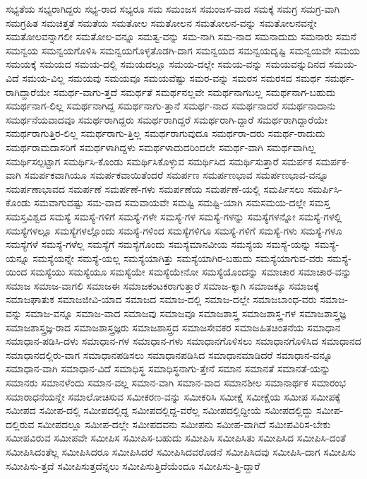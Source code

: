 {ಸಭ್ಯತೆಯ
ಸಭ್ಯರಾಗಿದ್ದರು
ಸಭ್ಯ-ರಾದ
ಸಭ್ಯರೂ
ಸಮ
ಸಮಂಜಸ
ಸಮಂಜಸ-ವಾದ
ಸಮಕ್ಕೆ
ಸಮಗ್ರ
ಸಮಗ್ರ-ವಾಗಿ
ಸಮಗ್ರಹಿತ
ಸಮಚಿತ್ತತೆ
ಸಮತೆಯ
ಸಮತೋಲ
ಸಮತೋಲನ
ಸಮತೋಲನ-ವನ್ನು
ಸಮತೋಲನವನ್ನೇ
ಸಮತೋಲವನ್ನಾಗಲೀ
ಸಮತೋಲ-ವನ್ನೂ
ಸಮತ್ವ-ವನ್ನು
ಸಮ-ನಾಗಿ
ಸಮ-ನಾದ
ಸಮನಾದುದು
ಸಮನಾರು
ಸಮನೆ
ಸಮನ್ವಯ
ಸಮನ್ವಯಗೊಳಿಸಿ
ಸಮನ್ವಯಗೊಳ್ಳತೊಡಗಿ-ದಾಗ
ಸಮನ್ವಯದ
ಸಮನ್ವಯದೃಷ್ಟಿ
ಸಮನ್ವಯವೇ
ಸಮಯ
ಸಮಯಕ್ಕೆ
ಸಮಯದ
ಸಮಯ-ದಲ್ಲಿ
ಸಮಯದಲ್ಲೂ
ಸಮಯ-ದಲ್ಲೇ
ಸಮಯ-ವನ್ನು
ಸಮಯವನ್ನುದಿನದ
ಸಮಯ-ವಿದೆ
ಸಮಯ-ವಿಲ್ಲ
ಸಮಯವು
ಸಮಯವೂ
ಸಮಯವೆಷ್ಟು
ಸಮರ-ವನ್ನು
ಸಮರಸ
ಸಮರಸದ
ಸಮರ್ಥ
ಸಮರ್ಥ-ರಾಗಿದ್ದಾರೆಯೇ
ಸಮರ್ಥ-ವಾಗು-ತ್ತದೆ
ಸಮರ್ಥತೆ
ಸಮರ್ಥನಲ್ಲವೇ
ಸಮರ್ಥನಾಗಬಲ್ಲ
ಸಮರ್ಥನಾಗ-ಬಹುದು
ಸಮರ್ಥನಾಗ-ಲಿಲ್ಲ
ಸಮರ್ಥನಾಗಿದ್ದ
ಸಮರ್ಥನಾಗು-ತ್ತಾನೆ
ಸಮರ್ಥ-ನಾದ
ಸಮರ್ಥನಾದರೆ
ಸಮರ್ಥನಾದಾನು
ಸಮರ್ಥನೆಯವಾದವೂ
ಸಮರ್ಥರಾಗಿದ್ದರು
ಸಮರ್ಥರಾಗಿದ್ದರೆ
ಸಮರ್ಥರಾಗಿ-ದ್ದಾರೆ
ಸಮರ್ಥರಾಗಿದ್ದಾರೆಯೇ
ಸಮರ್ಥರಾಗುತ್ತಿರ-ಲಿಲ್ಲ
ಸಮರ್ಥರಾಗು-ತ್ತಿಲ್ಲ
ಸಮರ್ಥರಾಗುವುದೂ
ಸಮರ್ಥರಾ-ದರು
ಸಮರ್ಥ-ರಾದುದು
ಸಮರ್ಥರಾಮದಾಸರಿಗೆ
ಸಮರ್ಥಳಾಗಿದ್ದಳು
ಸಮರ್ಥಳಾದುದರಿಂದಲೇ
ಸಮರ್ಥ-ವಾಗಿ
ಸಮರ್ಥವಾಗಿಲ್ಲ
ಸಮರ್ಥಿಸಲ್ಪಟ್ಟಾಗ
ಸಮರ್ಥಿಸಿ-ಕೊಂಡು
ಸಮರ್ಥಿಸಿಕೊಳ್ಳುವ
ಸಮರ್ಥಿಸಿದ
ಸಮರ್ಥಿಸುತ್ತಾರೆ
ಸಮರ್ಪಕ
ಸಮರ್ಪಕ-ವಾಗಿ
ಸಮರ್ಪಕವಾಗಿಯೂ
ಸಮರ್ಪಕವಾಯಿತೆಂದರೆ
ಸಮರ್ಪಣ
ಸಮರ್ಪಣಭಾವ
ಸಮರ್ಪಣಭಾವ-ವನ್ನೂ
ಸಮರ್ಪಣಾಭಾವದ
ಸಮರ್ಪಣೆ
ಸಮರ್ಪಣೆ-ಗಳು
ಸಮರ್ಪಣೆಯ
ಸಮರ್ಪಣೆ-ಯಲ್ಲಿ
ಸಮರ್ಪಿಸಲು
ಸಮರ್ಪಿಸಿ-ಕೊಂಡು
ಸಮವಾಗುವಷ್ಟು
ಸಮ-ವಾದ
ಸಮವಾಯವೇ
ಸಮಷ್ಟಿ
ಸಮಷ್ಟಿ-ಯಾಗಿ
ಸಮಸಮಯ-ದಲ್ಲೇ
ಸಮಸ್ತ
ಸಮಸ್ತವಿಶ್ವದ
ಸಮಸ್ಯೆ
ಸಮಸ್ಯೆ-ಗಳಿಗೆ
ಸಮಸ್ಯೆ-ಗಳೇ
ಸಮಸ್ಯೆ-ಗಳ
ಸಮಸ್ಯೆ-ಗಳನ್ನು
ಸಮಸ್ಯೆಗಳನ್ನೋ
ಸಮಸ್ಯೆ-ಗಳಲ್ಲಿ
ಸಮಸ್ಯೆಗಳಲ್ಲೂ
ಸಮಸ್ಯೆಗಳಲ್ಲೊಂದು
ಸಮಸ್ಯೆ-ಗಳಿಂದ
ಸಮಸ್ಯೆಗಳಿಗೂ
ಸಮಸ್ಯೆ-ಗಳಿಗೆ
ಸಮಸ್ಯೆ-ಗಳು
ಸಮಸ್ಯೆ-ಗಳೂ
ಸಮಸ್ಯೆಗಳೆ
ಸಮಸ್ಯೆ-ಗಳೆಲ್ಲ
ಸಮಸ್ಯೆಗೆ
ಸಮಸ್ಯೆಗೊಂದು
ಸಮಸ್ಯೆಮಾನವೀಯ
ಸಮಸ್ಯೆಯ
ಸಮಸ್ಯೆ-ಯನ್ನು
ಸಮಸ್ಯೆ-ಯನ್ನೂ
ಸಮಸ್ಯೆಯನ್ನೇ
ಸಮಸ್ಯೆ-ಯಲ್ಲ
ಸಮಸ್ಯೆಯಾಗಿತ್ತು
ಸಮಸ್ಯೆಯಾಗಿರ-ಬಹುದು
ಸಮಸ್ಯೆಯಾಗುವ-ವರು
ಸಮಸ್ಯೆ-ಯಿಂದ
ಸಮಸ್ಯೆಯು
ಸಮಸ್ಯೆಯೂ
ಸಮಸ್ಯೆಯೇ
ಸಮಸ್ಯೆಯೇನೋ
ಸಮಸ್ಯೆಯೊಂದನ್ನು
ಸಮಾಚಾರ
ಸಮಾಚಾರ-ವನ್ನು
ಸಮಾಜ
ಸಮಾಜ-ವಾಗಲಿ
ಸಮಾಜಈ
ಸಮಾಜಕಂಟಕರಾಗುತ್ತಾರೆ
ಸಮಾಜ-ಕ್ಕಾಗಿ
ಸಮಾಜಕ್ಕೂ
ಸಮಾಜಕ್ಕೆ
ಸಮಾಜಘಾತುಕ
ಸಮಾಜಜೀವಿ-ಯಾದ
ಸಮಾಜದ
ಸಮಾಜ-ದಲ್ಲಿ
ಸಮಾಜ-ದಲ್ಲೇ
ಸಮಾಜಬಾಂಧ-ವರು
ಸಮಾಜ-ವನ್ನು
ಸಮಾಜ-ವನ್ನೂ
ಸಮಾಜ-ವಾದ
ಸಮಾಜವು
ಸಮಾಜವೂ
ಸಮಾಜಶಾಸ್ತ್ರ
ಸಮಾಜಶಾಸ್ತ್ರ-ಗಳ
ಸಮಾಜಶಾಸ್ತ್ರಜ್ಞ
ಸಮಾಜಶಾಸ್ತ್ರಜ್ಞ-ರಾದ
ಸಮಾಜಶಾಸ್ತ್ರಜ್ಞರು
ಸಮಾಜಶಾಸ್ತ್ರದ
ಸಮಾಜಸೇವಕರ
ಸಮಾಜಹಿತಚಿಂತನೆಯ
ಸಮಾಧಾನ
ಸಮಾಧಾನ-ಪಡಿಸಿ-ದಳು
ಸಮಾಧಾನ-ಗಳ
ಸಮಾಧಾನ-ಗಳು
ಸಮಾಧಾನಗೊಳಿಸಲು
ಸಮಾಧಾನಗೊಳಿಸಿದ
ಸಮಾಧಾನದ
ಸಮಾಧಾನದಲ್ಲಿರು-ವಾಗ
ಸಮಾಧಾನಪಡಿಸಲು
ಸಮಾಧಾನಪಡಿಸಿದ
ಸಮಾಧಾನಮಾಡಿದರೆ
ಸಮಾಧಾನ-ವನ್ನೂ
ಸಮಾಧಾನ-ವಾಗಿ
ಸಮಾಧಾನ-ವಿದೆ
ಸಮಾಧಿಸ್ಥ
ಸಮಾಧಿಸ್ಥನಾಗು-ತ್ತೇನೆ
ಸಮಾನ
ಸಮಾನತೆ
ಸಮಾನತೆ-ಯನ್ನು
ಸಮಾನರು
ಸಮಾನಳೆಂದು
ಸಮಾನ-ವಲ್ಲ
ಸಮಾನ-ವಾಗಿ
ಸಮಾನ-ವಾದ
ಸಮಾನಶೀಲ
ಸಮಾನಾರ್ಥಕ
ಸಮಾರಂಭ
ಸಮಾರಾಧನೆಯನ್ನೇ
ಸಮಾಲೋಚಿಸುವ
ಸಮೀಕರಣ-ವನ್ನು
ಸಮೀಕರಿಸಿ
ಸಮೀಕ್ಷೆ
ಸಮೀಕ್ಷೆಯ
ಸಮೀಪ
ಸಮೀಪಕ್ಕೆ
ಸಮೀಪದ
ಸಮೀಪ-ದಲ್ಲಿ
ಸಮೀಪದಲ್ಲಿದ್ದ
ಸಮೀಪದಲ್ಲಿದ್ದ-ವರೆಲ್ಲ
ಸಮೀಪದಲ್ಲಿದ್ದೀಯೆ
ಸಮೀಪದಲ್ಲಿದ್ದು
ಸಮೀಪ-ದಲ್ಲಿರುವ
ಸಮೀಪದಲ್ಲೂ
ಸಮೀಪ-ದಲ್ಲೇ
ಸಮೀಪದವನು
ಸಮೀಪನು
ಸಮೀಪ-ವಾಗಿದೆ
ಸಮೀಪವಿರಿಸ-ಬೇಕು
ಸಮೀಪವಿರುವ
ಸಮೀಪವೇ
ಸಮೀಪಿಸ
ಸಮೀಪಿಸ-ಬಹುದು
ಸಮೀಪಿಸಿ
ಸಮೀಪಿಸಿತು
ಸಮೀಪಿಸಿದ
ಸಮೀಪಿಸಿ-ದಂತೆ
ಸಮೀಪಿಸಿದಂತೆಲ್ಲ
ಸಮೀಪಿಸಿದರೂ
ಸಮೀಪಿಸಿದರೆ
ಸಮೀಪಿಸಿದವರೊಡನೆ
ಸಮೀಪಿಸಿದವು
ಸಮೀಪಿಸಿ-ದಾಗ
ಸಮೀಪಿಸು
ಸಮೀಪಿಸು-ತ್ತದೆ
ಸಮೀಪಿಸುತ್ತದೆನ್ನಲು
ಸಮೀಪಿಸುತ್ತಿದೆಯೆಂದೂ
ಸಮೀಪಿಸು-ತ್ತಿ-ದ್ದಾರೆ
}
